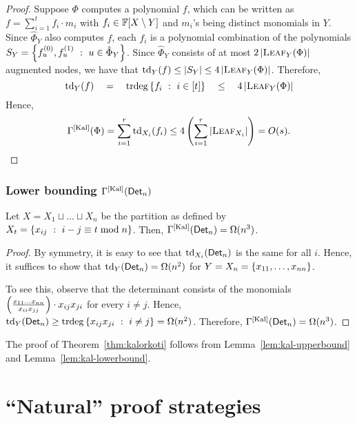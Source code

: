 \documentclass[12pt]{report}
\newcommand{\CM}[1]{\Gamma^{\mathrm{[#1]}}}
\begin{document}
\begin{proof}
  Suppose $\Phi$ computes a polynomial $f$, which can be written as  $f
  = \sum_{i=1}^t f_i\cdot m_i$ with $f_i \in \mathbb{F}[X\setminus Y]$ and $m_i$'s being
  distinct monomials in $Y$. Since $\hat{\Phi}_Y$ also computes $f$, each $f_i$ is a polynomial
  combination of the polynomials $S_Y = \left\{{f_{u}^{(0)},
    f_{u}^{(1)}}\ : \ {u\in \hat{\Phi}_Y}\right\}$. Since $\hat{\Phi}_Y$ consists of at
  most $2\left|\textsc{Leaf}_Y(\Phi)\right|$ augmented nodes, we have that
  $\mathrm{td}_Y(f) \leq |S_Y| \leq 4\left|\textsc{Leaf}_Y(\Phi)\right|$. Therefore, 
  $$
  \mathrm{td}_Y(f) \quad=\quad \mathrm{trdeg}\left\{{f_i}\ : \ {i\in [t]}\right\} \quad\leq\quad 4\left|\textsc{Leaf}_Y(\Phi)\right|
  $$
  Hence, 
  $$\CM{Kal}(\Phi) = \sum_{i=1}^r \mathrm{td}_{X_i}(f_i) \leq 4\inparen{\sum_{i=1}^r \abs{\textsc{Leaf}_{X_i}}} = O(s).
  $$
\end{proof}

\subsection{Lower bounding $\CM{Kal}(\Det_n)$}


\begin{lemma}\label{lem:kal-lowerbound}
  Let $X = X_1 \sqcup \dots \sqcup X_n$ be the partition as defined by
  $X_t = \left\{{x_{ij}}\ : \ {i-j\equiv t\bmod{n}}\right\}$. Then,
  $\CM{Kal}(\Det_n) = \Omega(n^3)$.
\end{lemma}
\begin{proof}
  By symmetry, it is easy to see that $\text{td}_{X_i}(\mathsf{Det}_n)$ is
  the same for all $i$. Hence, it suffices to show that
  $\text{td}_{Y}(\mathsf{Det}_n) = \Omega(n^2)$ for $Y = X_n = \left\{x_{11},\dots, x_{nn}\right\}$. 

  To see this, observe that the determinant consists of the monomials
  $\left(\frac{x_{11}\dots x_{nn}}{x_{ii}x_{jj}}\right)\cdot
  x_{ij}x_{ji}$ for every $i\neq j$. Hence, $\text{td}_{Y}(\mathsf{Det}_n)
  \geq \mathrm{trdeg}\left\{{x_{ij}x_{ji}}\ : \ {i\neq j}\right\} =
  \Omega(n^2)$. Therefore, $\CM{Kal}(\Det_n) =
  \Omega(n^3)$.
\end{proof}

The proof of Theorem~\ref{thm:kalorkoti} follows from
Lemma~\ref{lem:kal-upperbound} and Lemma~\ref{lem:kal-lowerbound}.

\chapter{``Natural'' proof strategies}\label{chap:roadmap}
\end{document}
